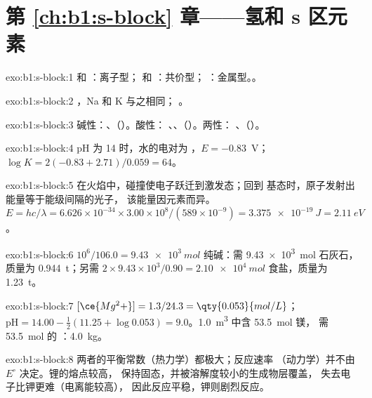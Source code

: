 \section*{第 \ref{ch:b1:s-block} 章——氢和 s 区元素}

\begin{solution}{exo:b1:s-block:1}
 和 ：离子型； 和 ：共价型；
：金属型。。
\end{solution}

\begin{solution}{exo:b1:s-block:2}
，Na 和 K 与之相同；
。
\end{solution}

\begin{solution}{exo:b1:s-block:3}
碱性：、（）。酸性：
、、（）。两性：
、（）。
\end{solution}

\begin{solution}{exo:b1:s-block:4}
pH 为 14 时，水的电对为 ，$E = -0.83$~V；
$\log K = 2(-0.83 + 2.71)/0.059 = 64$。
\end{solution}

\begin{solution}{exo:b1:s-block:5}
在火焰中，碰撞使电子跃迁到激发态；回到
基态时，原子发射出能量等于能级间隔的光子，
该能量因元素而异。$E = hc/\lambda = 6.626 \times 10^{-34} \times
3.00 \times 10^8/(589 \times 10^{-9}) = \qty{3.375e-19}{J} = \qty{2.11}{eV}$。
\end{solution}

\begin{solution}{exo:b1:s-block:6}
$10^6/106.0 = \qty{9.43e3}{mol}$ 纯碱：需 \qty{9.43e3}{mol}
石灰石，质量为 \qty{0.944}{t}；另需 $2 \times 9.43 \times 10^3/0.90 =
\qty{2.10e4}{mol}$ 食盐，质量为 \qty{1.23}{t}。
\end{solution}

\begin{solution}{exo:b1:s-block:7}
$[\ce{Mg^2+}] = 1.3/24.3 = \qty{0.053}{mol/L}$；$\mathrm{pH} = 14.00 -
\frac12(11.25 + \log 0.053) = 9.0$。\qty{1.0}{m^3} 中含 \qty{53.5}{mol} 镁，
需 \qty{53.5}{mol} 的 ：\qty{4.0}{kg}。
\end{solution}

\begin{solution}{exo:b1:s-block:8}
两者的平衡常数（热力学）都极大；反应速率
（动力学）并不由 $E^\circ$ 决定。锂的熔点较高，
保持固态，并被溶解度较小的生成物层覆盖，
失去电子比钾更难（电离能较高），
因此反应平稳，钾则剧烈反应。
\end{solution}

